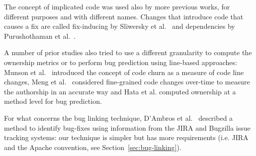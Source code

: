 The concept of implicated code was used also by more previous works, for different purposes and with different names. Changes that introduce code that causes a fix are called fix-inducing by Sliwersky et al.~\cite{sliwerski2005changes} and dependencies by Purushothaman et al.~\cite{purushothaman2004towards}.

A number of prior studies also tried to use a different granularity to compute the ownership metrics or to perform bug prediction using line-based approaches: Munson et al.~\cite{munson1998code} introduced the concept of code churn as a measure of code line changes, Meng et al.~\cite{meng2013mining} considered fine-grained code changes over-time to measure the authorship in an accurate way and Hata et al. \cite{hata2012bug} computed ownership at a method level for bug prediction.

For what concerns the bug linking technique, D'Ambros et al.~\cite{d2012evaluating} described a method to identify bug-fixes using information from the JIRA and Bugzilla issue tracking systems: our technique is simpler but has more requirements (i.e. JIRA and the Apache convention, see Section~\ref{sec:bug-linking}).

